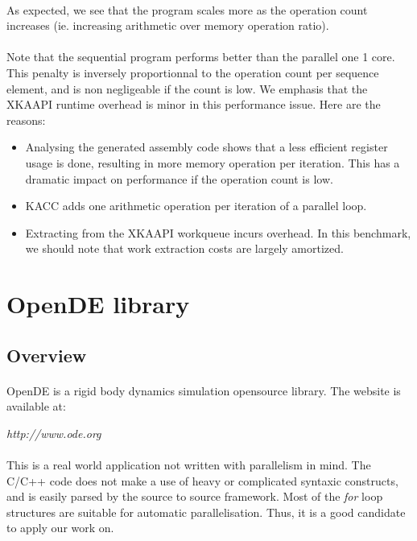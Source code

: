 \documentclass[a4paper, 11pt]{article}
\begin{document}
\paragraph{}
As expected, we see that the program scales more as the operation count increases
(ie. increasing arithmetic over memory operation ratio).

\paragraph{}
Note that the sequential program performs better than the parallel one 1 core.
This penalty is inversely proportionnal to the operation count per sequence
element, and is non negligeable if the count is low. We emphasis that the XKAAPI
runtime overhead is minor in this performance issue. Here are the reasons:
\begin{itemize}
  \item Analysing the generated assembly code shows that a less efficient
    register usage is done, resulting in more memory operation per iteration.
    This has a dramatic impact on performance if the operation count is low.
  \item KACC adds one arithmetic operation per iteration of a parallel loop.
  \item Extracting from the XKAAPI workqueue incurs overhead. In this benchmark,
    we should note that work extraction costs are largely amortized.
\end{itemize}

\newpage
\section{OpenDE library}

\subsection{Overview}
\paragraph{}
OpenDE is a rigid body dynamics simulation opensource library. The website is available at:
\begin{center}
  \textit{http://www.ode.org}
\end{center}

\paragraph{}
This is a real world application not written with parallelism in mind. The C/C++ code does not
make a use of heavy or complicated syntaxic constructs, and is easily parsed by the source to source
framework. Most of the \textit{for} loop structures are suitable for automatic parallelisation.
Thus, it is a good candidate to apply our work on.
\end{document}
